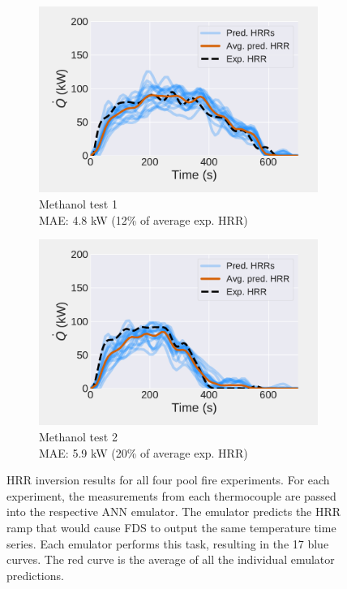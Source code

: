\documentclass{article}
\begin{document}
\begin{figure}[htbp]
\begin{subfigure}[t]{.45\textwidth}
  \end{subfigure}
   \begin{subfigure}[t]{.45\textwidth}
      \centering
      \includegraphics[width=\textwidth ,keepaspectratio]{figures/avg_inverse_meth_22in_1.pdf}
      \caption{Methanol test 1 \\ MAE: 4.8 kW (12\% of average exp. HRR) }
      \label{fig:result_meth_22in_1}
  \end{subfigure}
    \begin{subfigure}[t]{.45\textwidth}
      \centering
      \includegraphics[width=\textwidth ,keepaspectratio]{figures/avg_inverse_meth_22in_2.pdf}
      \caption{Methanol test 2 \\ MAE: 5.9 kW (20\% of average exp. HRR)}
      \label{fig:meth_22in_2}
  \end{subfigure}
  \caption{HRR inversion results for all four pool fire experiments. For each experiment, the measurements from each thermocouple are passed into the respective ANN emulator. The emulator predicts the HRR ramp that would cause FDS to output the same temperature time series. Each emulator performs this task, resulting in the 17 blue curves. The red curve is the average of all the individual emulator predictions.} 
  \label{fig:pool_results}
\end{figure}
\end{document}
